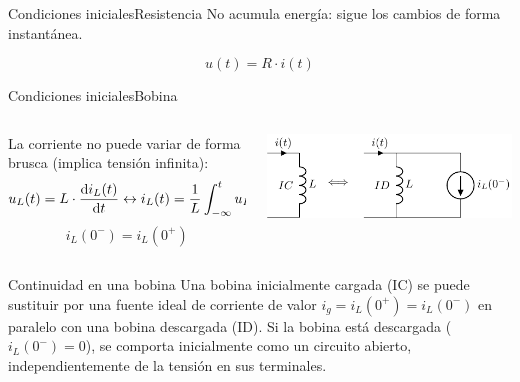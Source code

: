 \documentclass[aspectratio=169, xcolor={usenames,svgnames,dvipsnames}]{beamer}
\begin{document}
\begin{frame}{Condiciones iniciales}{Resistencia}
No acumula energía: sigue los cambios de forma instantánea.

\[
u(t) = R\cdot i(t)
\]
\end{frame}



\begin{frame}{Condiciones iniciales}{Bobina}
\begin{columns}
\begin{column}{0.5\linewidth}
La corriente no puede variar de forma brusca (implica tensión infinita):
\[
u_L(t) = L \cdot \diff{i_L(t)}{t}
\leftrightarrow
i_L(t) = \frac{1}{L} \int^t_{-\infty}u_L(t') \mathrm{d}t'
\]
\[
\boxed{i_L(0^-) = i_L(0^+)}
\]
\end{column}

\begin{column}{0.5\linewidth}
\begin{center}
    \includegraphics[width=0.8\linewidth]{../figs/condiciones_iniciales_L.pdf}
\end{center}
\end{column}
\end{columns}


\begin{block}{Continuidad en una bobina}
Una bobina inicialmente cargada (IC) se puede sustituir por una fuente ideal de corriente de valor $i_g=i_L(0^+)=i_L(0^-)$ en paralelo con una bobina descargada (ID). Si la bobina está descargada ($i_L(0^-)=0$), se comporta inicialmente como un \alert{circuito abierto}, independientemente de la tensión en sus terminales.
\end{block}
\end{frame}
\end{document}

